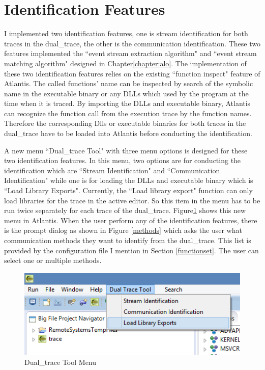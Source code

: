 \section{Identification Features}
I implemented two identification features, one is stream identification for both traces in the dual\_trace, the other is the communication identification. These two features implemented the ``event stream extraction algorithm" and ``event stream matching algorithm" designed in Chapter\ref{chapter:alo}. The implementation of these two identification features relies on the existing ``function inspect" feature of Atlantis. The called functions' name can be inspected  by  search of the symbolic name in the executable binary or any DLLs which used by the program at the time when it is traced. By importing the DLLs and executable binary, Atlantis can recognize the function call from the execution trace by the function names. Therefore the corresponding Dlls or executable binaries for both traces in the dual\_trace have to be loaded into Atlantis before conducting the identification.

A new menu ``Dual\_trace Tool" with three menu options is designed for these two identification features. In this menu, two options are for conducting the identification which are ``Stream Identification" and ``Communication Identification" while one is for loading the DLLs and executable binary which is ``Load Library Exports". Currently, the ``Load library export" function can only load libraries for the trace in the active editor. So this item in the menu has to be run twice separately for each trace of the dual\_trace.  Figure\ref{dualtracetoolmenu} shows this new menu in Atlantis. When the user perform any of the identification features, there is the prompt dialog as shown in Figure \ref{methods} which asks the user what communication methods they want to identify from the dual\_trace. This list is provided by the configuration file I mention in Section \ref{functionset}. The user can select one or multiple methods. 

\begin{figure}[H]
\centerline{\includegraphics{Figures/dualtracetoolmenu}}
 \caption{Dual\_trace Tool Menu}
\label{dualtracetoolmenu}
\end{figure}

